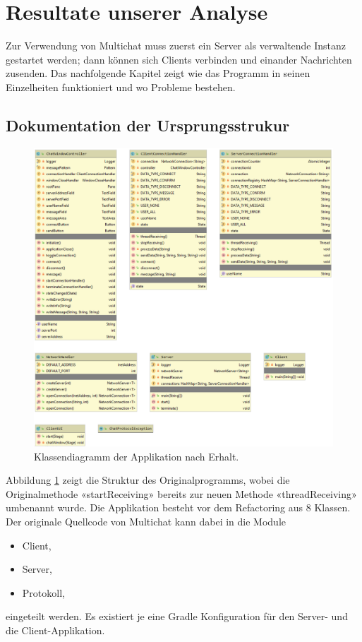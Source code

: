 \documentclass[10pt, hyperref, a4paper]{article}
\begin{document}
\newpage



\section{Resultate unserer Analyse}
Zur Verwendung von Multichat muss zuerst ein Server als verwaltende Instanz gestartet werden; dann können sich Clients verbinden und einander Nachrichten zusenden. Das nachfolgende Kapitel zeigt wie das Programm in seinen Einzelheiten funktioniert und wo Probleme bestehen.

\subsection{Dokumentation der Ursprungsstrukur}

	\begin{figure}[bht!]
		\centering
		\includegraphics[width=14cm]{..//diagramV1}
		\captionsetup{width=14cm}
		\caption{Klassendiagramm der Applikation nach Erhalt.}
		\label{fig:v1}
	\end{figure}

Abbildung \ref{fig:v1} zeigt die Struktur des Originalprogramms, wobei die Originalmethode «startReceiving» bereits zur neuen Methode «threadReceiving» umbenannt wurde. Die Applikation besteht vor dem Refactoring aus 8 Klassen. Der originale Quellcode von Multichat kann dabei in die Module
\begin{itemize}
	\item Client,
	\item Server,
	\item Protokoll,
\end{itemize}
eingeteilt werden. Es existiert je eine Gradle Konfiguration für den Server- und die Client-Applikation.
\end{document}

